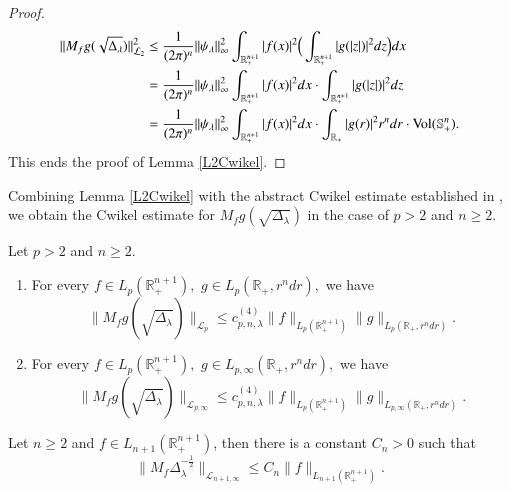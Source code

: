 \documentclass[12pt]{amsart}
\begin{document}
\begin{proof}
\begin{align*}
\|M_fg(\sqrt{\Delta_{\lambda}})\|_{\mathcal{L}_2}^2
&\leq\frac{1}{(2\pi)^n}\|\psi_{\lambda}\|_{\infty}^2\int_{\mathbb{R}_+^{n+1}}|f(x)|^2\Big(\int_{\mathbb{R}_+^{n+1}}|g(|z|)|^2dz\Big)dx\\
&=\frac{1}{(2\pi)^n}\|\psi_{\lambda}\|_{\infty}^2\int_{\mathbb{R}_+^{n+1}}|f(x)|^2dx\cdot \int_{\mathbb{R}_+^{n+1}}|g(|z|)|^2dz\\
&=\frac{1}{(2\pi)^n}\|\psi_{\lambda}\|_{\infty}^2\int_{\mathbb{R}_+^{n+1}}|f(x)|^2dx\cdot \int_{\mathbb{R}_+}|g(r)|^2r^ndr\cdot {\rm Vol}(\mathbb{S}^n_+).
\end{align*}
This ends the proof of Lemma \ref{L2Cwikel}.
\end{proof}

Combining  Lemma \ref{L2Cwikel} with  the abstract Cwikel estimate established in \cite{LeSZ}, we obtain the Cwikel estimate for $M_fg(\sqrt{\Delta_{\lambda}})$ in the case of $p>2$ and $n\geq 2.$

\begin{theorem}\label{cwikel estimate in bessel setting}
Let $p>2$ and $n\geq 2.$
\begin{enumerate}[{\rm (i)}]
\item For every $f\in L_p(\mathbb{R}_+^{n+1}),$ $g\in L_p(\mathbb{R}_+,r^ndr),$  we have
$$\|M_fg(\sqrt{\Delta_{\lambda}})\|_{\mathcal{L}_p}\leq c_{p,n,\lambda}^{(4)}\|f\|_{L_p(\mathbb{R}_+^{n+1})}\|g\|_{L_{p}(\mathbb{R}_+,r^ndr)}.$$
\item For every $f\in L_p(\mathbb{R}_+^{n+1}),$ $g\in L_{p,\infty}(\mathbb{R}_+,r^ndr),$ we have
$$\|M_fg(\sqrt{\Delta_{\lambda}})\|_{\mathcal{L}_{p,\infty}}\leq c_{p,n,\lambda}^{(4)}\|f\|_{L_p(\mathbb{R}_+^{n+1})}\|g\|_{L_{p,\infty}(\mathbb{R}_+,r^ndr)}.$$
\end{enumerate}
\end{theorem}



\begin{coro}\label{Cwikelspecial}
Let $n\geq 2$ and $f\in L_{n+1}(\mathbb{R}_+^{n+1})$, then there is a constant $C_n>0$ such that
$$\|M_f\Delta_{\lambda}^{-\frac12}\|_{\mathcal{L}_{n+1,\infty}}\leq C_n\|f\|_{L_{n+1}(\mathbb{R}_+^{n+1})}.$$
\end{coro}
\end{document}

